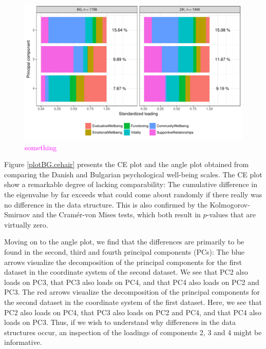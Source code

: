 \documentclass[titlepage,11pt,twoside]{article}
\newcommand{\hl}[1]{\textcolor{magenta}{#1}}
\begin{document}
\begin{figure}
\center
\includegraphics[scale = 0.7]{essDKBGpancake234.pdf}
\caption{\hl{something}}
\label{plotBG.pancake}
\end{figure}




Figure \ref{plotBG.cehair} presents the CE plot and the angle plot obtained from comparing the Danish and Bulgarian psychological well-being scales. The CE plot show a remarkable degree of lacking comparability: The cumulative difference in the eigenvalue by far exceeds what could come about randomly if there really was no difference in the data structure. This is also confirmed by the Kolmogorov-Smirnov and the Cram\'er-von Mises tests, which both result in $p$-values that are virtually zero. 

Moving on to the angle plot, we find that the differences are primarily to be found in the second, third and fourth principal components (PCs): The blue arrows visualize the decomposition of the principal components for the first dataset in the coordinate system of the second dataset. We see that PC2 also loads on PC3, that PC3 also loads on PC4, and that PC4 also loads on PC2 and PC3. The red arrows visualize the decomposition of the principal components for the second dataset in the coordinate system of the first dataset. Here, we see that PC2 also loads on PC4, that PC3 also loads on PC2 and PC4, and that PC4 also loads on PC3. Thus, if we wish to understand why differences in the data structures occur, an inspection of the loadings of components 2, 3 and 4 might be informative.
\end{document}
